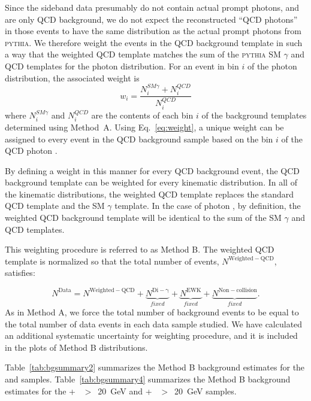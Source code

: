\documentclass[12pt,twoside,letterpaper,doublespace]{article}
\begin{document}
Since the sideband data presumably do not contain actual prompt photons, and are only QCD background, we do not expect the reconstructed ``QCD photons'' in those events to have the same \et distribution as the actual prompt photons from  \textsc{pythia}.  We therefore weight the events in the QCD background template in such a way that the weighted QCD template matches the sum of the \textsc{pythia} SM $\gamma$ and QCD templates for the photon \et distribution.  For an event in bin $i$ of the photon \et distribution, the associated weight is
\begin{equation}
w_i = \frac{N_i^{SM \gamma} + N_i^{QCD}}{N_i^{QCD}}\label{eq:weight}
\end{equation}
where $N_i^{SM \gamma}$ and $N_i^{QCD}$ are the contents of each bin $i$ of the background templates determined using Method~A.  Using Eq.~\ref{eq:weight}, a unique weight can be assigned to every event in the QCD background sample based on the bin $i$ of the QCD photon \et.

By defining a weight in this manner for every QCD background event, the QCD background template can be weighted for every kinematic distribution.  In all of the kinematic distributions, the weighted QCD template replaces the standard QCD template and the SM $\gamma$ template.  In the case of photon \et, by definition, the weighted QCD background template will be identical to the sum of the SM $\gamma$ and QCD templates.

This weighting procedure is referred to as Method B.  The weighted QCD template is normalized so that the total number of events, $N^\mathrm{Weighted-QCD}$, satisfies:

\begin{equation}
 N^\mathrm{Data} = N^\mathrm{Weighted-QCD}+\underbrace{N^\mathrm{Di-\gamma}}_{fixed}+\underbrace{N^\mathrm{EWK}}_{fixed}+\underbrace{N^\mathrm{Non-collision}}_{fixed}.
\label{eqa:MtdBnorm}
\end{equation}
As in Method A, we force the total number of background events to be equal to the total number of data events in each data sample studied.  We have calculated an additional systematic uncertainty for weighting procedure, and it is included in the plots of Method B distributions.

Table~\ref{tab:bgsummary2} summarizes the Method B background estimates for the \phoonejet and \photwojet samples.  Table~\ref{tab:bgsummary4} summarizes the Method B background estimates for the  \phoonejet + \met~$>$~20~GeV and \photwojet + \met~$>$~20~GeV samples.
\end{document}
